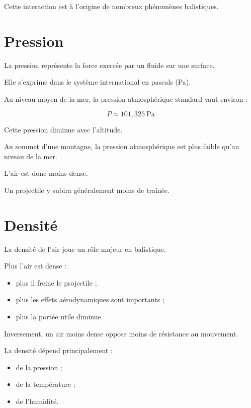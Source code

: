 Cette interaction est à l'origine de nombreux phénomènes balistiques.

\section{Pression}

La pression représente la force exercée par un fluide sur une surface.

Elle s'exprime dans le système international en pascals (Pa).

Au niveau moyen de la mer, la pression atmosphérique standard vaut
environ :

\begin{equation}
P \approx 101,325~\mathrm{Pa}
\end{equation}

Cette pression diminue avec l'altitude.

\begin{exemple}

Au sommet d'une montagne, la pression atmosphérique est plus faible qu'au
niveau de la mer.

L'air est donc moins dense.

Un projectile y subira généralement moins de traînée.

\end{exemple}

\section{Densité}

La densité de l'air joue un rôle majeur en balistique.

Plus l'air est dense :

\begin{itemize}
\item plus il freine le projectile ;
\item plus les effets aérodynamiques sont importants ;
\item plus la portée utile diminue.
\end{itemize}

Inversement, un air moins dense oppose moins de résistance au mouvement.

La densité dépend principalement :

\begin{itemize}
\item de la pression ;
\item de la température ;
\item de l'humidité.
\end{itemize}

